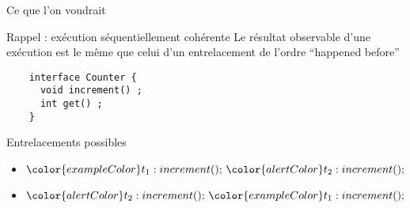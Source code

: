 \begin{frame}[fragile]{Ce que l'on voudrait}

  \begin{block}{Rappel : exécution séquentiellement cohérente}
    Le résultat observable \alert<2>{d'une exécution} est le même que celui d'un entrelacement de l'ordre ``happened before''
  \end{block}

  \vspace{3mm}
  \begin{lstlisting}
    interface Counter {
      void increment() ;
      int get() ;
    }
  \end{lstlisting}
  \vspace{3mm}

  
  \begin{block}{Entrelacements possibles}
    \vspace{-2mm}
    \begin{itemize}
    \item ${\color{exampleColor}t_1:increment();~} {\color{alertColor}t_2:increment();~}$ \hspace{5mm} 
    \item ${\color{alertColor}t_2:increment();~} {\color{exampleColor}t_1:increment();~}$ \hspace{5mm} 
    \end{itemize}
  \end{block}

  \pause
  \vspace{-1mm}


\end{frame}

